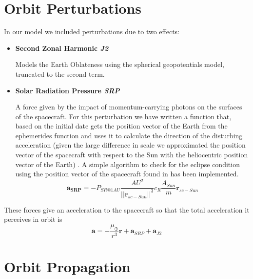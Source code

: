 \documentclass[11pt,a4paper]{report}
\renewcommand{\vec}[1]{\mathbf{#1}}
\begin{document}
\section{Orbit Perturbations}
In our model we included perturbations due to two effects:
\begin{itemize}
    \item \textbf{Second Zonal Harmonic \emph{J2}} \par Models the Earth Oblateness using the spherical geopotentials model, truncated to the second term.
    \item \textbf{Solar Radiation Pressure \emph{SRP}} \par A force given by the impact of momentum-carrying photons on the surfaces of the spacecraft. For this perturbation we have written a function that, based on the initial date gets the position vector of the Earth from the ephemerides function and uses it to calculate the direction of the disturbing acceleration (given the large difference in scale we approximated the position vector of the spacecraft with respect to the Sun with the heliocentric position vector of the Earth) . A simple algorithm to check for the eclipse condition using the position vector of the spacecraft found in \cite{SRP_Curtis} has been implemented.
    \begin{equation}
        \vec{a_{SRP}} = -P_{SR@1AU}\frac{AU^2}{||\vec{r}_{sc-Sun}||^3}c_R\frac{A_{Sun}}{m}\vec{r}_{sc-Sun}
    \end{equation}
\end{itemize}

These forces give an acceleration to the spacecraft so that the total acceleration it perceives in orbit is
\begin{equation}
    \vec{a} = - \frac{\mu_{\oplus}}{r^3}\vec{r} + \vec{a}_{SRP} + \vec{a}_{J2}
\end{equation}

\section{Orbit Propagation}
\end{document}

